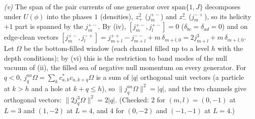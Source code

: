\emph{(v)} The span of the pair currents of one generator over $\mathrm{span}\{1, J\}$ decomposes under $U(\phi)$ into the phases $1$ (densities), $z_{+}^{2}$ ($j^{+-}_{m}$) and $z_{-}^{2}$ ($j^{-+}_{m}$), so its helicity $+1$ part is spanned by the $j^{+-}_{m}$. By (iv), $[j^{+-}_{m}, j^{+-}_{l}] = 0$ ($\delta_{bc} = \delta_{ad} = 0$) and on edge-clean vectors $[j^{+-}_{m}, j^{-+}_{l}] = j^{++}_{m+l} - j^{--}_{m+l} + m\,\delta_{m+l,0} = 2j^{3}_{m+l} + m\,\delta_{m+l,0}$. Let $\Omega$ be the bottom-filled window (each channel filled up to a level $h$ with the depth conditions); by (vi) this is the restriction to band modes of the null vacuum of (ii), the filled sea of negative null momentum on every generator. For $q < 0$, $j^{aa}_{q}\Omega = \sum_{k}c_{a,k}^{*}c_{a,k+q}\Omega$ is a sum of $|q|$ orthogonal unit vectors (a particle at $k > h$ and a hole at $k + q \le h$), so $\|j^{aa}_{q}\Omega\|^{2} = |q|$, and the two channels give orthogonal vectors: $\|2j^{3}_{q}\Omega\|^{2} = 2|q|$. (Checked: $2$ for $(m, l) = (0, -1)$ at $L = 3$ and $(1, -2)$ at $L = 4$, and $4$ for $(0, -2)$ and $(-1, -1)$ at $L = 4$.)


